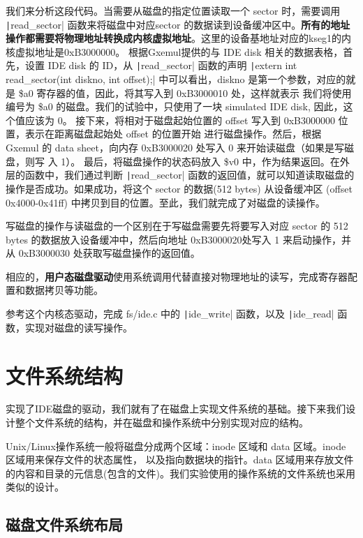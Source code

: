 我们来分析这段代码。当需要从磁盘的指定位置读取一个 sector 时，需要调用 \texttt|read_sector|
函数来将磁盘中对应sector 的数据读到设备缓冲区中。\textbf{所有的地址操作都需要将物理地址转换成内核虚拟地址}。这里的设备基地址对应的kseg1的内核虚拟地址是0xB3000000。
根据Gxemul提供的与 IDE disk 相关的数据表格，首先，设置 IDE disk 的 ID，从
\texttt|read_sector| 函数的声明 \texttt|extern int read_sector(int diskno, int offset);|
中可以看出，diskno 是第一个参数，对应的就是 \$a0 寄存器的值，因此，将其写入到 0xB3000010 处，这样就表示
我们将使用编号为 \$a0 的磁盘。我们的试验中，只使用了一块 simulated IDE disk, 因此，这个值应该为 0。
接下来，将相对于磁盘起始位置的 offset 写入到 0xB3000000 位置，表示在距离磁盘起始处 offset 的位置开始
进行磁盘操作。然后，根据 Gxemul 的 data sheet，向内存 0xB3000020 处写入 0 来开始读磁盘（如果是写磁盘，则写
入 1）。
最后，将磁盘操作的状态码放入 \$v0 中，作为结果返回。在外层的函数中，我们通过判断 \texttt|read_sector| 函数的返回值，就可以知道读取磁盘的操作是否成功。如果成功，将这个 sector 的数据(512 bytes) 从设备缓冲区 (offset 0x4000-0x41ff) 中拷贝到目的位置。至此，我们就完成了对磁盘的读操作。

写磁盘的操作与读磁盘的一个区别在于写磁盘需要先将要写入对应 sector 的 512 bytes 的数据放入设备缓冲中，然后向地址 0xB3000020处写入 1 来启动操作，并从 0xB3000030 处获取写磁盘操作的返回值。

相应的，\textbf{用户态磁盘驱动}使用系统调用代替直接对物理地址的读写，完成寄存器配置和数据拷贝等功能。

\begin{exercise}
参考这个内核态驱动，完成 fs/ide.c 中的 \texttt|ide_write| 函数，以及 \texttt|ide_read| 函数，实现对磁盘的读写操作。
\end{exercise}

\section{文件系统结构}
实现了IDE磁盘的驱动，我们就有了在磁盘上实现文件系统的基础。接下来我们设计整个文件系统的结构，并在磁盘和操作系统中分别实现对应的结构。

\begin{note}
Unix/Linux操作系统一般将磁盘分成两个区域：inode 区域和 data 区域。inode 区域用来保存文件的状态属性，
以及指向数据块的指针。data 区域用来存放文件的内容和目录的元信息(包含的文件)。我们实验使用的操作系统的文件系统也采用类似的设计。
\end{note}

\subsection{磁盘文件系统布局}

